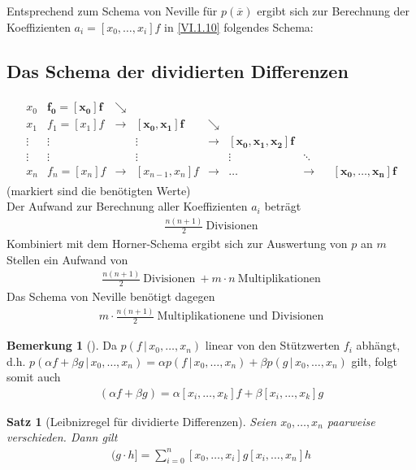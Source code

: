 \documentclass[ngerman,fontsize=11pt, paper=a4, parskip=half, titlepage=true, toc=bib]{scrbook}
\theoremstyle{definition}
\newtheorem{Bem}[Def]{Bemerkung}	%
\theoremstyle{plain}
\newtheorem{Satz}[Def]{Satz}		%
\newcommand{\subsectione}[1]{\addtocounter{Def}{1}\subsection{#1}}
\newenvironment{Satze}[1][]{ %
  \begin{Satz}[#1]  }
  { \end{Satz}
  	\addtocounter{subsection}{1}}
\newenvironment{Beme}[1][]{ %
  \begin{Bem}[#1]}
  {\end{Bem}
  	\addtocounter{subsection}{1}}
\begin{document}
Entsprechend zum Schema von Neville für $p(\overline{x})$
ergibt sich zur Berechnung der Koeffizienten $a_i=[x_0,\dots,x_i]f$
in \eqref{VI.1.10} folgendes Schema:

\subsectione{Das Schema der dividierten Differenzen}
 \begin{gather*}
   \begin{array}{ccccccccc}
          x_0 & \boldsymbol{f_0=[x_0]f} & \searrow\\
          x_1 & f_1=[x_1]f& \rightarrow &\boldsymbol{ [x_0,x_1]f}&\searrow \\
          \vdots&\vdots &&\vdots &\rightarrow & \boldsymbol{[x_0,x_1,x_2]f}\\
          \vdots&\vdots &&\vdots &&\vdots&\ddots\\
          x_n& f_n=[x_n]f &\rightarrow&[x_{n-1},x_n]f&\rightarrow &
          \dots &\rightarrow && \boldsymbol{[x_0,\dots,x_n]f}
   \end{array}
 \end{gather*}
(markiert sind die benötigten Werte)\\
Der Aufwand zur Berechnung aller Koeffizienten $a_i$ beträgt
\begin{gather*}
  \frac{n(n+1)}{2} ~\text{Divisionen}
\end{gather*}
Kombiniert mit dem Horner-Schema ergibt sich
zur Auswertung von $p$ an $m$ Stellen ein Aufwand von
\begin{gather*}
  \frac{n(n+1)}{2} ~\text{Divisionen}
  ~+m\cdot n   ~\text{Multiplikationen}
\end{gather*}
Das Schema von Neville benötigt dagegen
\begin{gather*}
  m\cdot\frac{n(n+1)}{2} ~\text{Multiplikationene und Divisionen}
\end{gather*}

\begin{Beme}
  Da $p(f\,|\, x_0,\dots, x_n)$ linear von den Stützwerten $f_i$
  abhängt,
  d.h. $p(\alpha f+\beta g\,|\, x_0,\dots, x_n)= 
  \alpha p(f\,|\, x_0,\dots, x_n)+\beta p(g\,|\, x_0,\dots, x_n)$
  gilt, folgt somit auch
  \begin{gather*}
    [x_i,\dots, x_k](\alpha f+\beta g)
    =  \alpha [x_i,\dots, x_k]f+\beta [x_i,\dots, x_k]g 
  \end{gather*}
\end{Beme}


\begin{Satze}[Leibnizregel für dividierte Differenzen]\label{6.1.10}
  Seien $x_0,\dots, x_n$ paarweise verschieden. Dann gilt
  \begin{gather}
    [x_0,\dots, x_n] (g\cdot h] = \sum_{i=0}^{n}[x_0,\dots,x_i]g[x_i,\dots,x_n]h
    \label{VI.1.14}
  \end{gather}
\end{Satze}
\end{document}
